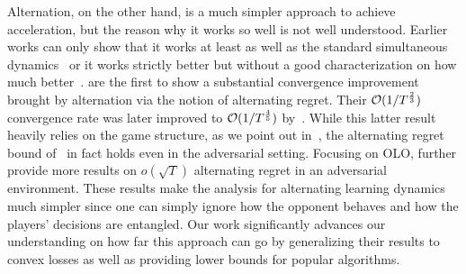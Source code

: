 Alternation, on the other hand, is a much simpler approach to achieve acceleration, but the reason why it works so well is not well understood.
Earlier works can only show that it works at least as well as the standard simultaneous dynamics~\citep{tammelin2014solving, burch2019revisiting} or it works strictly better but without a good characterization on how much better~\citep{grand2024solving}.
\citet{wibisono2022alternating} are the first to show a substantial convergence improvement brought by alternation via the notion of alternating regret.
Their $\mathcal{O}(1/T^{\frac{2}{3}})$ convergence rate was later improved to $\mathcal{O}(1/T^{\frac{4}{5}})$ by~\citet{katona2024symplectic}.
While this latter result heavily relies on the game structure, as we point out in~, the alternating regret bound of~\citet{wibisono2022alternating} in fact holds even in the adversarial setting.
Focusing on OLO, \citet{cevher2024alternation} further provide more results on $o(\sqrt{T})$ alternating regret in an adversarial environment.
These results make the analysis for alternating learning dynamics much simpler since one can simply ignore how the opponent behaves and how the players' decisions are entangled. 
Our work significantly advances our understanding on how far this approach can go by generalizing their results to convex losses as well as providing lower bounds for popular algorithms.